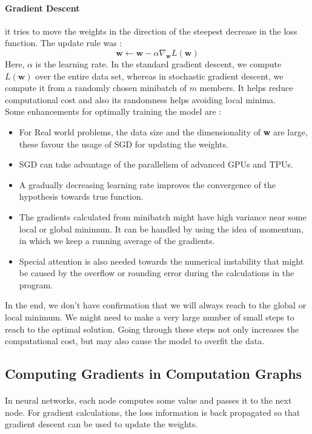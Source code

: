 \documentclass{article}
\begin{document}
  \paragraph{Gradient Descent} it tries to move the weights in the direction of the steepest decrease in the loss function. The update rule was : 
    \begin{equation*}
      \mathbf{w} \leftarrow \mathbf{w} - \alpha \nabla_{\mathbf{w}} L(\mathbf{w})
    \end{equation*}
    Here, $\alpha$ is the learning rate. In the standard gradient descent, we compute $L(\mathbf{w})$ over the entire data set, whereas in stochastic gradient descent, we compute it from a randomly chosen minibatch of $m$ members. It helps reduce computational cost and also its randomness helps avoiding local minima.\\
    Some enhancements for optimally training the model are : 
    \begin{itemize}
      \item For Real world problems, the data size and the dimensionality of \textbf{w} are large, these favour the usage of SGD for updating the weights. 
      \item SGD can take advantage of the parallelism of advanced GPUs and TPUs.
      \item A gradually decreasing learning rate improves the convergence of the hypothesis towards true function.
      \item The gradients calculated from minibatch might have high variance near some local or global minimum. It can be handled by using the idea of momentum, in which we keep a running average of the gradients.
      \item Special attention is also needed towards the numerical instability that might be caused by the overflow or rounding error during the calculations in the program.
    \end{itemize}
    In the end, we don't have confirmation that we will always reach to the global or local minimum. We might need to make a very large number of small steps to reach to the optimal solution. Going through these steps not only increases the computational cost, but may also cause the model to overfit the data.

  \subsection{Computing Gradients in Computation Graphs}
  \paragraph{} In neural networks, each node computes some value and passes it to the next node. For gradient calculations, the loss information is back propagated so that gradient descent can be used to update the weights.
\end{document}
